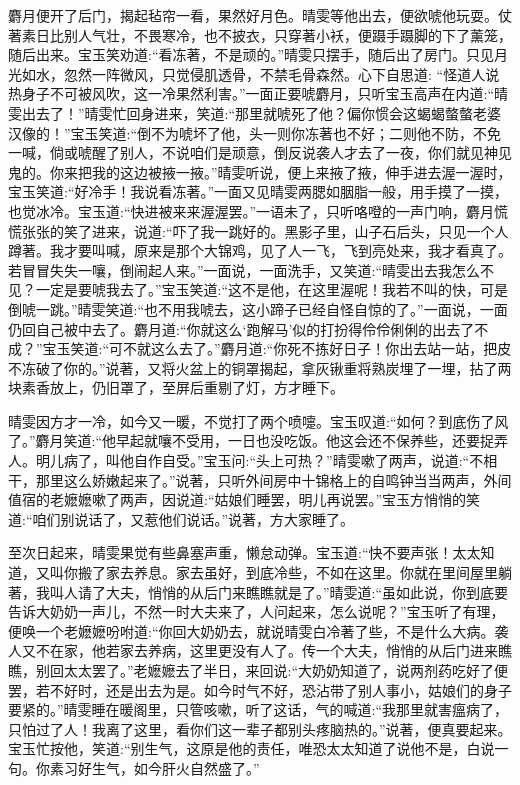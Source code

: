 \begin{parag}
    麝月便开了后门，揭起毡帘一看，果然好月色。晴雯等他出去，便欲唬他玩耍。仗著素日比别人气壮，不畏寒冷，也不披衣，只穿著小袄，便蹑手蹑脚的下了薰笼，随后出来。宝玉笑劝道:“看冻著，不是顽的。”晴雯只摆手，随后出了房门。只见月光如水，忽然一阵微风，只觉侵肌透骨，不禁毛骨森然。心下自思道: “怪道人说热身子不可被风吹，这一冷果然利害。”一面正要唬麝月，只听宝玉高声在内道:“晴雯出去了！”晴雯忙回身进来，笑道:“那里就唬死了他？偏你惯会这蝎蝎螫螫老婆汉像的！”宝玉笑道:“倒不为唬坏了他，头一则你冻著也不好；二则他不防，不免一喊，倘或唬醒了别人，不说咱们是顽意，倒反说袭人才去了一夜，你们就见神见鬼的。你来把我的这边被掖一掖。”晴雯听说，便上来掖了掖，伸手进去渥一渥时，宝玉笑道:“好冷手！我说看冻著。”一面又见晴雯两腮如胭脂一般，用手摸了一摸，也觉冰冷。宝玉道:“快进被来来渥渥罢。”一语未了，只听咯噔的一声门响，麝月慌慌张张的笑了进来，说道:“吓了我一跳好的。黑影子里，山子石后头，只见一个人蹲著。我才要叫喊，原来是那个大锦鸡，见了人一飞，飞到亮处来，我才看真了。若冒冒失失一嚷，倒闹起人来。”一面说，一面洗手，又笑道:“晴雯出去我怎么不见？一定是要唬我去了。”宝玉笑道:“这不是他，在这里渥呢！我若不叫的快，可是倒唬一跳。”晴雯笑道:“也不用我唬去，这小蹄子已经自怪自惊的了。”一面说，一面仍回自己被中去了。麝月道:“你就这么‘跑解马’似的打扮得伶伶俐俐的出去了不成？”宝玉笑道:“可不就这么去了。”麝月道:“你死不拣好日子！你出去站一站，把皮不冻破了你的。”说著，又将火盆上的铜罩揭起，拿灰锹重将熟炭埋了一埋，拈了两块素香放上，仍旧罩了，至屏后重剔了灯，方才睡下。
\end{parag}


\begin{parag}
    晴雯因方才一冷，如今又一暖，不觉打了两个喷嚏。宝玉叹道:“如何？到底伤了风了。”麝月笑道:“他早起就嚷不受用，一日也没吃饭。他这会还不保养些，还要捉弄人。明儿病了，叫他自作自受。”宝玉问:“头上可热？”晴雯嗽了两声，说道:“不相干，那里这么娇嫩起来了。”说著，只听外间房中十锦格上的自鸣钟当当两声，外间值宿的老嬷嬷嗽了两声，因说道:“姑娘们睡罢，明儿再说罢。”宝玉方悄悄的笑道:“咱们别说话了，又惹他们说话。”说著，方大家睡了。
\end{parag}


\begin{parag}
    至次日起来，晴雯果觉有些鼻塞声重，懒怠动弹。宝玉道:“快不要声张！太太知道，又叫你搬了家去养息。家去虽好，到底冷些，不如在这里。你就在里间屋里躺著，我叫人请了大夫，悄悄的从后门来瞧瞧就是了。”晴雯道:“虽如此说，你到底要告诉大奶奶一声儿，不然一时大夫来了，人问起来，怎么说呢？”宝玉听了有理，便唤一个老嬷嬷吩咐道:“你回大奶奶去，就说晴雯白冷著了些，不是什么大病。袭人又不在家，他若家去养病，这里更没有人了。传一个大夫，悄悄的从后门进来瞧瞧，别回太太罢了。”老嬷嬷去了半日，来回说:“大奶奶知道了，说两剂药吃好了便罢，若不好时，还是出去为是。如今时气不好，恐沾带了别人事小，姑娘们的身子要紧的。”晴雯睡在暖阁里，只管咳嗽，听了这话，气的喊道:“我那里就害瘟病了，只怕过了人！我离了这里，看你们这一辈子都别头疼脑热的。”说著，便真要起来。宝玉忙按他，笑道:“别生气，这原是他的责任，唯恐太太知道了说他不是，白说一句。你素习好生气，如今肝火自然盛了。”
\end{parag}


